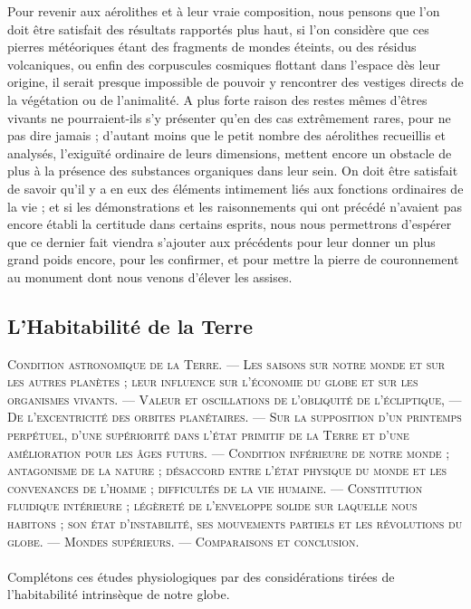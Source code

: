 \documentclass[a4paper, 11pt, oneside, landscape]{article}
\begin{document}
Pour revenir aux aérolithes et à leur vraie composition, nous pensons que l'on doit être satisfait des résultats rapportés plus haut, si l'on considère que ces pierres météoriques étant des fragments de mondes éteints, ou des résidus volcaniques, ou enfin des corpuscules cosmiques flottant dans l'espace dès leur origine, il serait presque impossible de pouvoir y rencontrer des vestiges directs de la végétation ou de l'animalité. A plus forte raison des restes mêmes d'êtres vivants ne pourraient-ils s'y présenter qu'en des cas extrêmement rares, pour ne pas dire jamais ; d'autant moins que le petit nombre des aérolithes recueillis et analysés, l'exiguïté ordinaire de leurs dimensions, mettent encore un obstacle de plus à la présence des substances organiques dans leur sein. On doit être satisfait de savoir qu'il y a en eux des éléments intimement liés aux fonctions ordinaires de la vie ; et si les démonstrations et les raisonnements qui ont précédé n'avaient pas encore établi la certitude dans certains esprits, nous nous permettrons d'espérer que ce dernier fait viendra s'ajouter aux précédents pour leur donner un plus grand poids encore, pour les confirmer, et pour mettre la pierre de couronnement au monument dont nous venons d'élever les assises.
\clearpage
\subsection{L'Habitabilité de la Terre}
\begin{center}
\scshape
\small
Condition astronomique de la Terre. --- Les saisons sur notre monde et sur les autres planètes ; leur influence sur l'économie du globe et sur les organismes vivants. --- Valeur et oscillations de l'obliquité de l'écliptique, --- De l'excentricité des orbites planétaires. --- Sur la supposition d'un printemps perpétuel, d'une supériorité dans l'état primitif de la Terre et d'une amélioration pour les âges futurs. --- Condition inférieure de notre monde ; antagonisme de la nature ; désaccord entre l'état physique du monde et les convenances de l'homme ; difficultés de la vie humaine. --- Constitution fluidique intérieure ; légèreté de l'enveloppe solide sur laquelle nous habitons ; son état d'instabilité, ses mouvements partiels et les révolutions du globe. --- Mondes supérieurs. --- Comparaisons et conclusion.
\end{center}
\paragraph{}
Complétons ces études physiologiques par des considérations tirées de l'habitabilité intrinsèque de notre globe.
\end{document}
